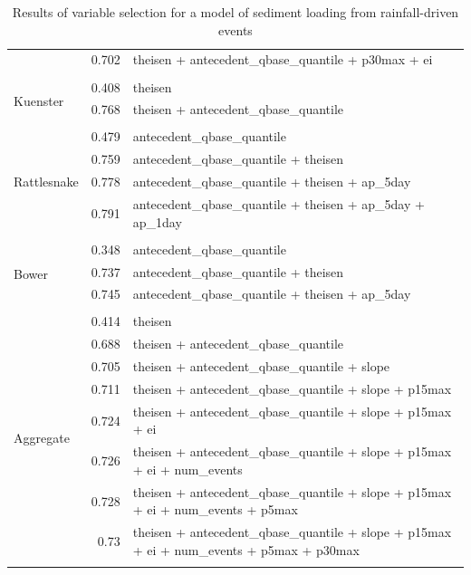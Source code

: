 \documentclass[10pt]{article}
\begin{document}
\begin{table}[h]
\begin{center}
\begin{tabular}{lrl}
 & 0.702 & theisen + antecedent\_qbase\_quantile + p30max + ei\\ 
\vspace{2mm}\\ \multirow{3}{*}{Kuenster} & 0.408 & theisen\\ 
 & 0.768 & theisen + antecedent\_qbase\_quantile\\ 
\vspace{2mm}\\ \multirow{5}{*}{Rattlesnake} & 0.479 & antecedent\_qbase\_quantile\\ 
 & 0.759 & antecedent\_qbase\_quantile + theisen\\ 
 & 0.778 & antecedent\_qbase\_quantile + theisen + ap\_5day\\ 
 & 0.791 & antecedent\_qbase\_quantile + theisen + ap\_5day + ap\_1day\\ 
\vspace{2mm}\\ \multirow{4}{*}{Bower} & 0.348 & antecedent\_qbase\_quantile\\ 
 & 0.737 & antecedent\_qbase\_quantile + theisen\\ 
 & 0.745 & antecedent\_qbase\_quantile + theisen + ap\_5day\\ 
\vspace{2mm}\\ \multirow{9}{*}{Aggregate} & 0.414 & theisen\\ 
 & 0.688 & theisen + antecedent\_qbase\_quantile\\ 
 & 0.705 & theisen + antecedent\_qbase\_quantile + slope\\ 
 & 0.711 & theisen + antecedent\_qbase\_quantile + slope + p15max\\ 
 & 0.724 & theisen + antecedent\_qbase\_quantile + slope + p15max + ei\\ 
 & 0.726 & theisen + antecedent\_qbase\_quantile + slope + p15max + ei + num\_events\\ 
 & 0.728 & theisen + antecedent\_qbase\_quantile + slope + p15max + ei + num\_events + p5max\\ 
 & 0.73 & theisen + antecedent\_qbase\_quantile + slope + p15max + ei + num\_events + p5max + p30max\\ 
\vspace{2mm}\\     \end{tabular}
    \caption{Results of variable selection for a model of sediment loading from rainfall-driven events\label{sed_r_square_nosnow}}
    \end{center}
\end{table}
\end{document}
